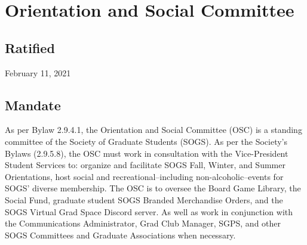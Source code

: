 \section{Orientation and Social Committee}
\subsection{Ratified}
February 11, 2021
\subsection{Mandate}
As per Bylaw 2.9.4.1, the Orientation and Social Committee (OSC) is a standing committee of the Society of Graduate Students (SOGS). As per the Society's Bylaws (2.9.5.8), the OSC must work in consultation with the Vice-President Student Services to: organize and facilitate SOGS Fall, Winter, and Summer Orientations, host social and recreational--including non-alcoholic--events for SOGS' diverse membership. The OSC is to oversee the Board Game Library, the Social Fund, graduate student SOGS Branded Merchandise Orders, and the SOGS Virtual Grad Space Discord server. As well as work in conjunction with the Communications Administrator, Grad Club Manager, SGPS, and other SOGS Committees and Graduate Associations when necessary.

